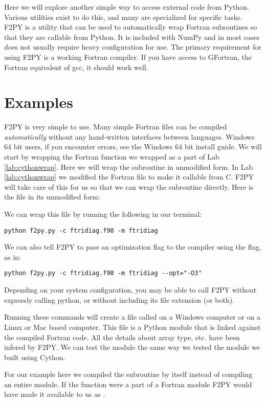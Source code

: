 \label{lab:f2py}

Here we will explore another simple way to access external code from Python.
Various utilities exist to do this, and many are specialized for specific tasks.
F2PY is a utility that can be used to automatically wrap Fortran subroutines so that they are callable from Python.
It is included with NumPy and in most cases does not usually require heavy configuration for use.
The primary requirement for using F2PY is a working Fortran compiler.
If you have access to GFortran, the Fortran equivalent of gcc, it should work well.

\section*{Examples}

F2PY is very simple to use.
Many simple Fortran files can be compiled \emph{automatically} without any hand-written interfaces between languages.
Windows 64 bit users, if you encounter errors, see the Windows 64 bit install guide.
We will start by wrapping the Fortran function we wrapped as a part of Lab \ref{lab:cythonwrap}.
Here we will wrap the subroutine in unmodified form.
In Lab \ref{lab:cythonwrap} we modified the Fortran file to make it callable from C.
F2PY will take care of this for us so that we can wrap the subroutine directly.
Here is the file in its unmodified form:

We can wrap this file by running the following in our terminal:
\begin{lstlisting}[style=ShellInput]
python f2py.py -c ftridiag.f90 -m ftridiag
\end{lstlisting}
We can also tell F2PY to pass an optimization flag to the compiler using the  flag, as in:
\begin{lstlisting}[style=ShellInput]
python f2py.py -c ftridiag.f90 -m ftridiag --opt="-O3"
\end{lstlisting}
Depending on your system configuration, you may be able to call F2PY without expressly calling python, or without including its file extension (or both).

Running these commands will create a file called  on a Windows computer or  on a Linux or Mac based computer.
This file is a Python module that is linked against the compiled Fortran code.
All the details about array type, etc. have been infered by F2PY.
We can test the module the same way we tested the module we built using Cython.

For our example here we compiled the subroutine by itself instead of compiling an entire module.
If the function were a part of a Fortran module  F2PY would have made it available to us as .

